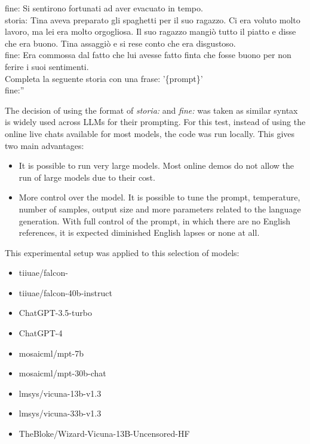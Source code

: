 \begin{itemize}
{                fine: Si sentirono fortunati ad aver evacuato in tempo.\\
                storia: Tina aveva preparato gli spaghetti per il suo ragazzo.	Ci era voluto molto lavoro, ma lei era molto orgogliosa.	Il suo ragazzo mangiò tutto il piatto e disse che era buono.	Tina assaggiò e si rese conto che era disgustoso.\\
                fine: Era commossa dal fatto che lui avesse fatto finta che fosse buono per non ferire i suoi sentimenti.\\
                Completa la seguente storia con una frase: '\{prompt\}'\\
                fine:''}
\end{itemize}
The decision of using the format of \emph{storia:} and \emph{fine:} was taken as similar syntax is widely used across LLMs for their prompting.
For this test, instead of using the online live chats available for most models, the code was run locally. This gives two main advantages:
\begin{itemize}
    \item It is possible to run very large models. Most online demos do not allow the run of large models due to their cost.
    \item More control over the model. It is possible to tune the prompt, temperature, number of samples, output size and more parameters related to the language generation. With full control of the prompt, in which there are no English references, it is expected diminished English lapses or none at all.
\end{itemize}
This experimental setup was applied to this selection of models:
\begin{itemize}
    \item   tiiuae/falcon- \cite{falcon40b}
    \item   tiiuae/falcon-40b-instruct \cite{falcon40b}
    \item   ChatGPT-3.5-turbo \cite{chatgpt}
    \item   ChatGPT-4 \cite{openai2023gpt4}
    \item   mosaicml/mpt-7b \cite{mpt7b}
    \item   mosaicml/mpt-30b-chat \cite{mpt30b}
    \item   lmsys/vicuna-13b-v1.3 \cite{touvronllama}
    \item   lmsys/vicuna-33b-v1.3 \cite{touvronllama}
    \item   TheBloke/Wizard-Vicuna-13B-Uncensored-HF \cite{wizard-vicuna}
\end{itemize}
